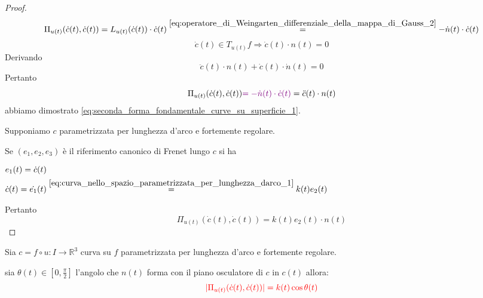         \begin{proof}
        \mbox{}
        \[ \Pi_{u(t)} (\dot{c}(t), \dot{c}(t)) = L_{u(t)} (\dot{c}(t)) \cdot \dot{c}(t) \overset{\eqref{eq:operatore_di_Weingarten_differenziale_della_mappa_di_Gauss_2}}{=} -\dot{n}(t) \cdot \dot{c}(t) \]
        \[ \dot{c}(t) \in T_{u(t)} f \Rightarrow \dot{c}(t) \cdot n(t) = 0 \]
        Derivando 
        \[ \ddot{c}(t) \cdot n(t) + \dot{c}(t) \cdot \dot{n}(t) = 0 \]
        Pertanto 
        \[ \Pi_{u(t)} (\dot{c}(t), \dot{c}(t)) \textcolor{violet}{= -\dot{n}(t) \cdot \dot{c}(t)} = \ddot{c}(t) \cdot n(t) \]
        abbiamo dimostrato \eqref{eq:seconda_forma_fondamentale_curve_su_superficie_1}.

        Supponiamo $c$ parametrizzata per lunghezza d'arco e fortemente regolare.

        Se $(e_1, e_2, e_3)$ è il riferimento canonico di Frenet lungo $c$ si ha 
        
        $\begin{aligned}
        &e_1(t)= \dot{c}(t) \\
        &\dot{c}(t)= \dot{e_1}(t) \overset{\eqref{eq:curva_nello_spazio_parametrizzata_per_lunghezza_darco_1}}{=} k(t) e_2(t)
        \end{aligned}$

        Pertanto 
        \[ \Pi_{u(t)} (\dot{c}(t), \dot{c}(t)) = k(t) e_2(t) \cdot n(t) \]
        \end{proof}
        \newpage
        \begin{corollario}
        \label{cor:th_di_Meusnier}
        \mbox{}

        Sia $c = f \circ u \colon I \to \mathbb{R}^3$ curva su $f$ parametrizzata per lunghezza d'arco e fortemente regolare.

        sia $\theta(t) \in [0, \frac{\pi}{2}]$ l'angolo che $n(t)$ forma con il piano osculatore di $c$ in $c(t)$ allora:
        \begin{equation}
        \color{red} \lvert\Pi_{u(t)} (\dot{c}(t), \dot{c}(t))\rvert = k(t) \cos \theta(t)
        \end{equation}
        \end{corollario}
